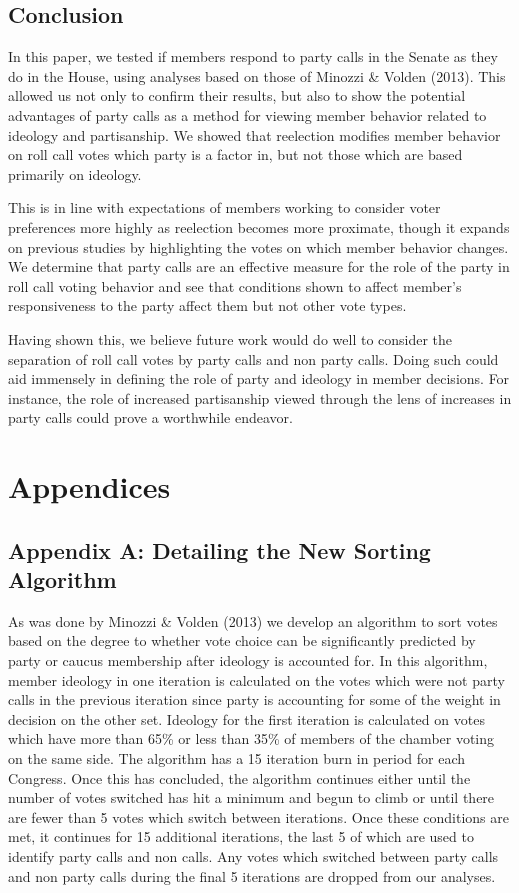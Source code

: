 \documentclass[12pt]{article}
\begin{document}
\subsection{Conclusion}

In this paper, we tested if members respond to party calls in the Senate as they do in the House, using analyses based on those of Minozzi \& Volden (2013). This allowed us not only to confirm their results, but also to show the potential advantages of party calls as a method for viewing member behavior related to ideology and partisanship. We showed that reelection modifies member behavior on roll call votes which party is a factor in, but not those which are based primarily on ideology. 

This is in line with expectations of members working to consider voter preferences more highly as reelection becomes more proximate, though it expands on previous studies by highlighting the votes on which member behavior changes. We determine that party calls are an effective measure for the role of the party in roll call voting behavior and see that conditions shown to affect member's responsiveness to the party affect them but not other vote types.

Having shown this, we believe future work would do well to consider the separation of roll call votes by party calls and non party calls. Doing such could aid immensely in defining the role of party and ideology in member decisions. For instance, the role of increased partisanship viewed through the lens of increases in party calls could prove a worthwhile endeavor.

\pagebreak

\section{Appendices}

\subsection{Appendix A: Detailing the New Sorting Algorithm}

As was done by Minozzi \& Volden (2013) we develop an algorithm to sort votes based on the degree to whether vote choice can be significantly predicted by party or caucus membership after ideology is accounted for. In this algorithm, member ideology in one iteration is calculated on the votes which were not party calls in the previous iteration since party is accounting for some of the weight in decision on the other set. Ideology for the first iteration is calculated on votes which have more than 65\% or less than 35\% of members of the chamber voting on the same side. The algorithm has a 15 iteration burn in period for each Congress. Once this has concluded, the algorithm continues either until the number of votes switched has hit a minimum and begun to climb or until there are fewer than 5 votes which switch between iterations. Once these conditions are met, it continues for 15 additional iterations, the last 5 of which are used to identify party calls and non calls. Any votes which switched between party calls and non party calls during the final 5 iterations are dropped from our analyses.
\end{document}
